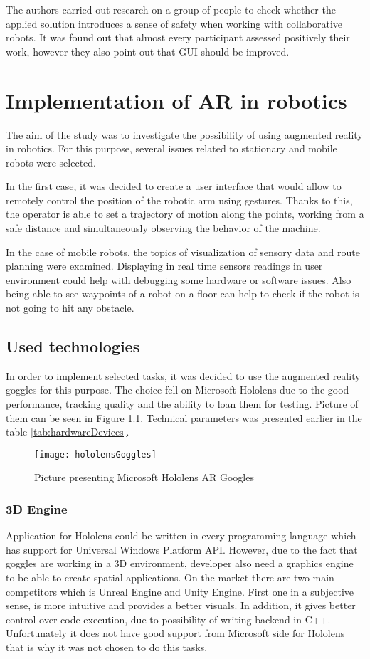 \documentclass[printmode,en]{mgr}
\begin{document}
The authors carried out research on a group of people to check whether the applied solution introduces a sense of safety when working with collaborative robots. It was found out that almost every participant assessed positively their work, however they also point out that GUI should be improved.

\chapter{Implementation of AR in robotics}
The aim of the study was to investigate the possibility of using augmented reality in robotics. For this purpose, several issues related to stationary and mobile robots were selected.

In the first case, it was decided to create a user interface that would allow to remotely control the position of the robotic arm using gestures. Thanks to this, the operator is able to set a trajectory of motion along the points, working from a safe distance and simultaneously observing the behavior of the machine.

In the case of mobile robots, the topics of visualization of sensory data and route planning were examined. Displaying in real time sensors readings in user environment could help with debugging some hardware or software issues. Also being able to see waypoints of a robot on a floor can help to check if the robot is not going to hit any obstacle.

\section{Used technologies}
In order to implement selected tasks, it was decided to use the augmented reality goggles for this purpose. The choice fell on Microsoft Hololens due to the good performance, tracking quality and the ability to loan them for testing. Picture of them can be seen in Figure \ref{fig:hololensGoggles}. Technical parameters was presented earlier in the table \ref{tab:hardwareDevices}.

\begin{figure}[!ht]
  \centering
    \texttt{[image: hololensGoggles]}
  \caption{Picture presenting Microsoft Hololens AR Googles \cite{hololensGoggles}}
  \label{fig:hololensGoggles}
\end{figure}

\subsection{3D Engine}
Application for Hololens could be written in every programming language which has support for Universal Windows Platform API. However, due to the fact that goggles are working in a 3D environment, developer also need a graphics engine to be able to create spatial applications. On the market there are two main competitors which is Unreal Engine and Unity Engine. First one in a subjective sense, is more intuitive and provides a better visuals. In addition, it gives better control over code execution, due to possibility of writing backend in C++. Unfortunately it does not have good support from Microsoft side for Hololens that is why it was not chosen to do this tasks.
\end{document}

